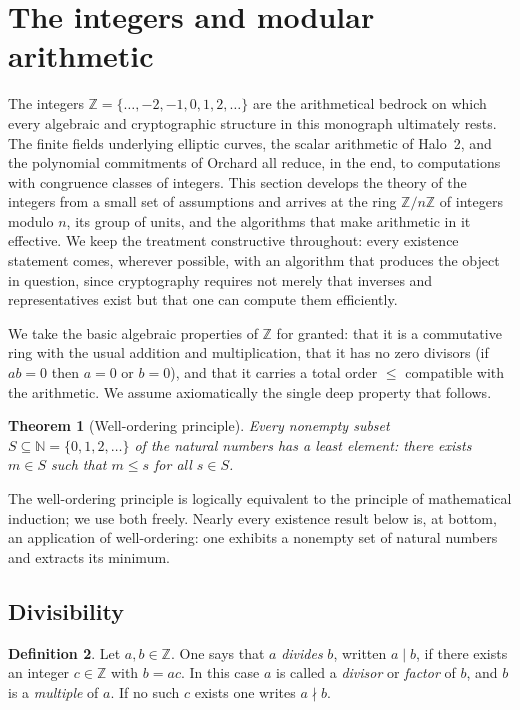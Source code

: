 \documentclass[11pt,a4paper]{article}
\newtheorem{theorem}{Theorem}[section]
\theoremstyle{definition}
\newtheorem{definition}[theorem]{Definition}
\theoremstyle{remark}
\newcommand{\N}{\ensuremath{\mathbb{N}}}
\newcommand{\Z}{\ensuremath{\mathbb{Z}}}
\begin{document}
\section{The integers and modular arithmetic}\label{sec:intmod}

The integers \(\Z = \{\dots,-2,-1,0,1,2,\dots\}\) are the arithmetical bedrock on which every algebraic and cryptographic structure in this monograph ultimately rests. The finite fields underlying elliptic curves, the scalar arithmetic of Halo~2, and the polynomial commitments of Orchard all reduce, in the end, to computations with congruence classes of integers. This section develops the theory of the integers from a small set of assumptions and arrives at the ring \(\Z/n\Z\) of integers modulo \(n\), its group of units, and the algorithms that make arithmetic in it effective. We keep the treatment constructive throughout: every existence statement comes, wherever possible, with an algorithm that produces the object in question, since cryptography requires not merely that inverses and representatives exist but that one can compute them efficiently.

We take the basic algebraic properties of \(\Z\) for granted: that it is a commutative ring with the usual addition and multiplication, that it has no zero divisors (if \(ab=0\) then \(a=0\) or \(b=0\)), and that it carries a total order \(\le\) compatible with the arithmetic. We assume axiomatically the single deep property that follows.

\begin{theorem}[Well-ordering principle]\label{intmod:thm:wop}
Every nonempty subset \(S\subseteq\N=\{0,1,2,\dots\}\) of the natural numbers has a least element: there exists \(m\in S\) such that \(m\le s\) for all \(s\in S\).
\end{theorem}

The well-ordering principle is logically equivalent to the principle of mathematical induction; we use both freely. Nearly every existence result below is, at bottom, an application of well-ordering: one exhibits a nonempty set of natural numbers and extracts its minimum.

\subsection{Divisibility}\label{intmod:sub:divisibility}

\begin{definition}\label{intmod:def:divides}
Let \(a,b\in\Z\). One says that \(a\) \emph{divides} \(b\), written \(a\mid b\), if there exists an integer \(c\in\Z\) with \(b=ac\). In this case \(a\) is called a \emph{divisor} or \emph{factor} of \(b\), and \(b\) is a \emph{multiple} of \(a\). If no such \(c\) exists one writes \(a\nmid b\).
\end{definition}
\end{document}

